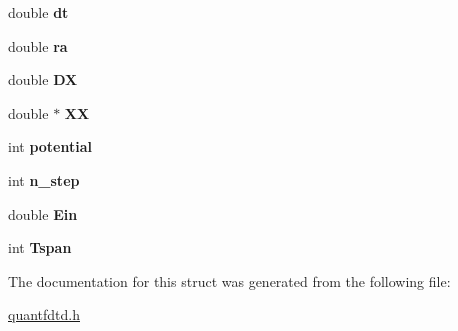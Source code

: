 \begin{DoxyCompactItemize}
\item 
\hypertarget{structinput__data__s_a3f2563da6d68e81c42411fc7e59cd53f}{double {\bfseries dt}}\label{structinput__data__s_a3f2563da6d68e81c42411fc7e59cd53f}

\item 
\hypertarget{structinput__data__s_a336a4e6624a40c1daa6a5830ce0c690f}{double {\bfseries ra}}\label{structinput__data__s_a336a4e6624a40c1daa6a5830ce0c690f}

\item 
\hypertarget{structinput__data__s_aea029d8b2fe2171ab9f27f725d1b7d55}{double {\bfseries D\-X}}\label{structinput__data__s_aea029d8b2fe2171ab9f27f725d1b7d55}

\item 
\hypertarget{structinput__data__s_a9c6ca240aa75d63077bcbcb2371c20cd}{double $\ast$ {\bfseries X\-X}}\label{structinput__data__s_a9c6ca240aa75d63077bcbcb2371c20cd}

\item 
\hypertarget{structinput__data__s_ad24d227fe154564f221b915c55b34ee1}{int {\bfseries potential}}\label{structinput__data__s_ad24d227fe154564f221b915c55b34ee1}

\item 
\hypertarget{structinput__data__s_a7327a245358383be73d381006558fc79}{int {\bfseries n\-\_\-step}}\label{structinput__data__s_a7327a245358383be73d381006558fc79}

\item 
\hypertarget{structinput__data__s_acecd0ab14007c9027830800c1417ca62}{double {\bfseries Ein}}\label{structinput__data__s_acecd0ab14007c9027830800c1417ca62}

\item 
\hypertarget{structinput__data__s_a3eb6a0e2dd9306afab05dbfe400193e4}{int {\bfseries Tspan}}\label{structinput__data__s_a3eb6a0e2dd9306afab05dbfe400193e4}

\end{DoxyCompactItemize}


The documentation for this struct was generated from the following file\-:\begin{DoxyCompactItemize}
\item 
\hyperlink{quantfdtd_8h}{quantfdtd.\-h}\end{DoxyCompactItemize}

